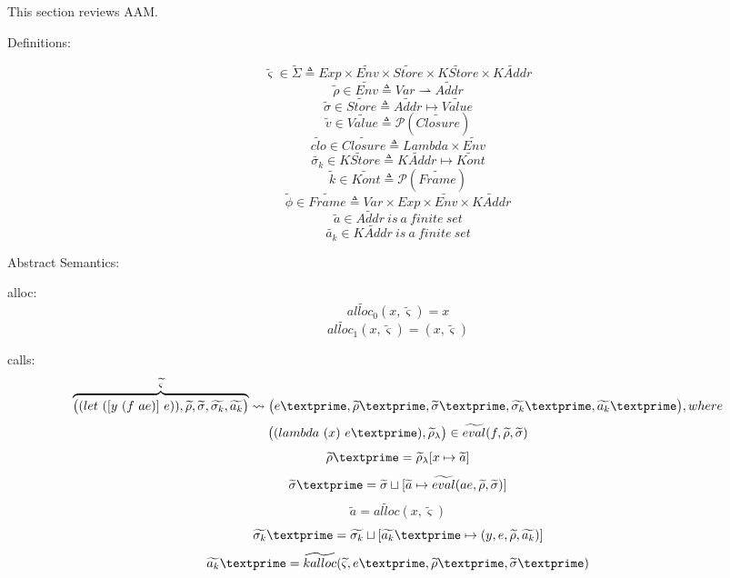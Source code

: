 \documentclass{article}
\begin{document}
This section reviews AAM\@.

Definitions:

\[
\tag{states}
\widetilde{\varsigma}\in\widetilde{\Sigma} \triangleq Exp \times \widetilde{Env} \times \widetilde{Store}
\times \widetilde{KStore} \times \widetilde{KAddr}
\]
\[
\tag{environments}
\widetilde{\rho} \in \widetilde{Env} \triangleq Var \rightharpoonup \widetilde{Addr}
\]
\[
\tag{stores}
\widetilde{\sigma} \in \widetilde{Store} \triangleq \widetilde{Addr} \mapsto \widetilde{Value}
\]
\[
\tag{abstract values}
\widetilde{v} \in \widetilde{Value} \triangleq \mathcal{P}(\widetilde{Closure})
\]
\[
\tag{closures}
\widetilde{clo} \in \widetilde{Closure} \triangleq Lambda \times \widetilde{Env}
\]
\[
\tag{continuation stores}
\widetilde{\sigma_k} \in \widetilde{KStore} \triangleq  \widetilde{KAddr} \mapsto  \widetilde{Kont}
\]
\[
\tag{abstract continuations}
\widetilde{k} \in  \widetilde{Kont} \triangleq  \mathcal{P}(\widetilde{Frame})
\]
\[
\tag{stack frames}
\widetilde{\phi} \in  \widetilde{Frame} \triangleq Var \times Exp \times  \widetilde{Env} \times  \widetilde{KAddr}
\]
\[
\tag{value addresses}
\widetilde{a} \in \widetilde{Addr} \ is\ a\ finite\ set
\]
\[
\tag{continuation addresses}
\widetilde{a_k} \in \widetilde{KAddr} \ is\ a\ finite\ set
\]

Abstract Semantics:

alloc:
\[
\widetilde{alloc_0} (x, \widetilde{\varsigma}) = x
\]
\[
\widetilde{alloc_1} (x, \widetilde{\varsigma}) = (x, \widetilde{\varsigma})
\]

calls:
\[
\overbrace{
\big((let\ ([y\ (f\ ae)]\ e)), \widetilde{\rho}, \widetilde{\sigma}, \widetilde{\sigma_k}, \widetilde{a_k} \big)
}^{\widetilde{\varsigma}}
\leadsto \big(e\textprime,\widetilde{\rho}\textprime, \widetilde{\sigma}\textprime, \widetilde{\sigma_k}\textprime, \widetilde{a_k}\textprime \big), where
\]
\[
\big((lambda\ (x)\ e\textprime), \widetilde{\rho}_{\lambda}  \big) \in \widetilde{eval}(f, \widetilde{\rho}, \widetilde{\sigma})
\]
\[
\widetilde{\rho}\textprime = \widetilde{\rho}_{\lambda}[x \mapsto \widetilde{a}]
\]
\[
\widetilde{\sigma}\textprime = \widetilde{\sigma} \sqcup [\widetilde{a} \mapsto \widetilde{eval}(ae, \widetilde{\rho}, \widetilde{\sigma})]
\]
\[
\widetilde{a} = \widetilde{alloc}(x, \widetilde{\varsigma})
\]
\[
\widetilde{\sigma_k}\textprime = \widetilde{\sigma_k} \sqcup [\widetilde{a_k}\textprime \mapsto {(y, e, \widetilde{\rho}, \widetilde{a_k})}]
\]
\[
\widetilde{a_k}\textprime = \widetilde{kalloc}(\widetilde{\varsigma}, e\textprime, \widetilde{\rho}\textprime, \widetilde{\sigma}\textprime)
\]
\end{document}
